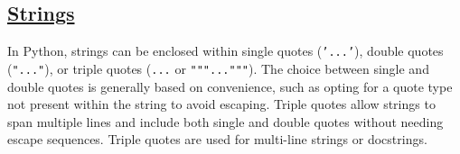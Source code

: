 \subsection*{\href{https://sourceacademy.org/sicpjs/2.3.1}{Strings}}

In Python, strings can be enclosed within single quotes (\texttt{'...'}), double quotes (\texttt{"..."}), or triple quotes (\texttt{\textquotesingle{}\textquotesingle{}\textquotesingle{}...\textquotesingle{}\textquotesingle{}\textquotesingle{}}
 or \texttt{"""..."""}). The choice between single and double quotes is generally based on convenience, such as opting for a quote type not present within the string to avoid escaping. Triple quotes allow strings to span multiple lines and include both single and double quotes without needing escape sequences. Triple quotes are used for multi-line strings or docstrings.


